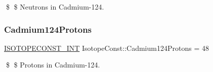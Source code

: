 \$ \$ Neutrons in Cadmium-\/124. \mbox{\label{group___isotope_const-_cadmium-_cd124_ga457f4f08060d5638558df7e7ed4eda6b}} 
\subsubsection{\texorpdfstring{Cadmium124\+Protons}{Cadmium124Protons}}
{\footnotesize\ttfamily \mbox{\hyperlink{group___isotope_const-_macros_ga5f18360b3e99483a35c32d789e62621c}{I\+S\+O\+T\+O\+P\+E\+C\+O\+N\+S\+T\+\_\+\+I\+NT}} Isotope\+Const\+::\+Cadmium124\+Protons = 48}

\$ \$ Protons in Cadmium-\/124. 